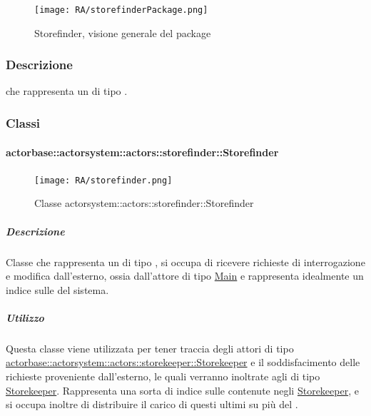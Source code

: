 \documentclass{scalatekids-article}
\begin{document}
\begin{figure}[H]
  \begin{center}
    \texttt{[image: RA/storefinderPackage.png]}
    \caption{Storefinder, visione generale del package}
  \end{center}
\end{figure}

\subsubsection{Descrizione}
 che rappresenta un  di tipo .

\subsubsection{Classi}

\paragraph{actorbase::actorsystem::actors::storefinder::Storefinder}
\label{sec:actorbase::actorsystem::actors::storefinder::Storefinder}

\begin{figure}[H]
  \begin{center}
    \texttt{[image: RA/storefinder.png]}
    \caption{Classe actorsystem::actors::storefinder::Storefinder}
  \end{center}
\end{figure}

\subparagraph{Descrizione}

Classe che rappresenta un  di tipo , si occupa
di ricevere richieste di interrogazione e modifica dall'esterno, ossia
dall'attore di tipo \hyperref[sec:actorbase::actorsystem::actors::Main]{Main} e
rappresenta idealmente un indice sulle  del sistema.

\subparagraph{Utilizzo}
Questa classe viene utilizzata per tener traccia degli attori di tipo
\hyperref[sec:actorbase::actorsystem::actors::storekeeper::Storekeeper]{actorbase::actorsystem::actors::storekeeper::Storekeeper}
e il soddisfacimento delle richieste proveniente dall'esterno, le quali verranno
inoltrate agli  di tipo
\hyperref[sec:actorbase::actorsystem::actors::storefinder::Storekeeper]{Storekeeper}.
Rappresenta una sorta di indice sulle  contenute negli
\hyperref[sec:actorbase::actorsystem::actors::storefinder::Storekeeper]{Storekeeper},
e si occupa inoltre di distribuire il carico di questi ultimi su più
 del .
\end{document}
